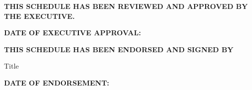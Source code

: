 \textbf{THIS SCHEDULE HAS BEEN REVIEWED AND APPROVED BY THE EXECUTIVE.}

\vspace{0.5cm}
\textbf{DATE OF EXECUTIVE APPROVAL:}

\vspace{0.5cm}
\textbf{THIS SCHEDULE HAS BEEN ENDORSED AND SIGNED BY}

\signature{Name}{Title}

\vspace{0.5cm}
\textbf{DATE OF ENDORSEMENT:}
